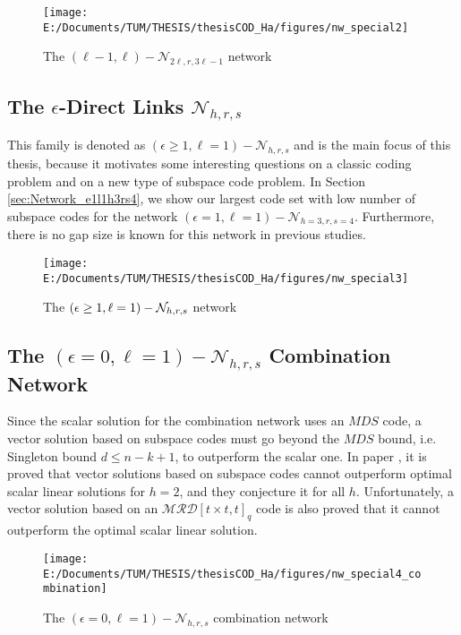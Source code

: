 \begin{figure}[H]
\caption{The $\left(\ell-1,\ell\right)-\mathcal{N}_{2\ell,r,3\ell-1}$ network
\label{fig:network_special2}}

\centering{}\texttt{[image: E:/Documents/TUM/THESIS/thesisCOD\_Ha/figures/nw\_special2]}
\end{figure}


\subsection{The $\epsilon$-Direct Links $\mathcal{N}_{h,r,s}$}

This family is denoted as $\left(\epsilon\geq1,\ell=1\right)-\mathcal{N}_{h,r,s}$
and is the main focus of this thesis, because it motivates some interesting
questions on a classic coding problem and on a new type of subspace
code problem. In Section \ref{sec:Network_e1l1h3rs4}, we show our
largest code set with low number of subspace codes for the network
$\left(\epsilon=1,\ell=1\right)-\mathcal{N}_{h=3,r,s=4}$. Furthermore,
there is no gap size is known for this network in previous studies.

\begin{figure}[H]
\caption{The $\left(\epsilon\protect\geq1,\ell=1\right)-\mathcal{N}_{h,r,s}$
network \label{fig:network_special3}}

\centering{}\texttt{[image: E:/Documents/TUM/THESIS/thesisCOD\_Ha/figures/nw\_special3]}
\end{figure}


\subsection{The $\left(\epsilon=0,\ell=1\right)-\mathcal{N}_{h,r,s}$ Combination
Network}

Since the scalar solution for the combination network uses an $MDS$
code, a vector solution based on subspace codes must go beyond the
$MDS$ bound, i.e. Singleton bound $d\leq n-k+1$, to outperform the
scalar one. In paper \cite{Wachter-Zeh:2018}, it is proved that vector
solutions based on subspace codes cannot outperform optimal scalar
linear solutions for $h=2$, and they conjecture it for all $h$.
Unfortunately, a vector solution based on an $\mathcal{MRD}\left[t\times t,t\right]_{q}$
code is also proved that it cannot outperform the optimal scalar linear
solution.

\begin{figure}[H]
\caption{The $\left(\epsilon=0,\ell=1\right)-\mathcal{N}_{h,r,s}$ combination
network \label{fig:network_special4}}

\centering{}\texttt{[image: E:/Documents/TUM/THESIS/thesisCOD\_Ha/figures/nw\_special4\_combination]}
\end{figure}


